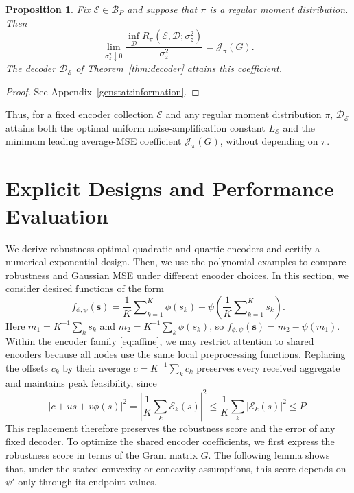 \documentclass[journal,12pt,onecolumn,draftclsnofoot]{IEEEtran}
\newtheorem{proposition}{Proposition}
\newcommand{\enc}{\mathscr{E}}\newcommand{\dec}{\mathscr{D}}\newcommand{\R}{\mathbb R}\newcommand{\C}{\mathbb C}
\begin{document}
\begin{proposition}
\label{prop:general-small-noise}\label{genstat:fixed}
Fix $\enc\in\mathcal B_P$ and suppose that $\pi$ is a regular moment distribution. Then
\begin{equation}
 \lim_{\sigma_z^2\downarrow0}
 \frac{\inf_{\dec}R_\pi(\enc,\dec;\sigma_z^2)}{\sigma_z^2}
 =\mathcal J_\pi(G).
 \label{eq:fixed-bayes-limit}
\end{equation}
The decoder ${ \dec_\enc}$ of Theorem~\ref{thm:decoder} attains this coefficient.
\end{proposition}
\begin{proof}
See Appendix~\ref{genstat:information}.
\end{proof}


Thus, for a fixed encoder collection $\enc$ and any regular moment distribution $\pi$, $\dec_\enc$
attains both the optimal uniform noise-amplification constant $L_\enc$ and the
minimum leading average-MSE coefficient $\mathcal J_\pi(G)$, without depending on $\pi$.



\section{Explicit Designs and Performance Evaluation}\label{sec:examples}


We derive robustness-optimal quadratic and quartic encoders and
certify a numerical exponential design. Then, we use the polynomial
examples to compare robustness and Gaussian MSE under different
encoder choices. In this section, we consider desired functions of the form
\begin{equation}
 f_{\phi,\psi}(\boldsymbol s)
 =\frac1K\sum\nolimits_{k=1}^K\phi(s_k)
 -\psi\!\left(\frac1K\sum\nolimits_{k=1}^K s_k\right).
 \label{eq:target}
\end{equation}
Here $m_1=K^{-1}\sum_k s_k$ and
$m_2=K^{-1}\sum_k\phi(s_k)$, so
$f_{\phi,\psi}(\boldsymbol s)=m_2-\psi(m_1)$.  Within the encoder family \eqref{eq:affine}, we may restrict
attention to shared encoders because all nodes use the same
local preprocessing functions. Replacing the offsets $c_k$
by their average $c=K^{-1}\sum_k c_k$ preserves every
received aggregate and maintains peak feasibility, since
$$
|c+us+v\phi(s)|^2
=\left|\frac1K\sum_k\enc_k(s)\right|^2
\le\frac1K\sum_k|\enc_k(s)|^2
\le P.
$$
This replacement therefore preserves the robustness score
and the error of any fixed decoder. To optimize the shared encoder coefficients, we first express
the robustness score in terms of the Gram matrix $G$.
The following lemma shows that, under the stated convexity
or concavity assumptions, this score depends on $\psi'$
only through its endpoint values.
\end{document}
